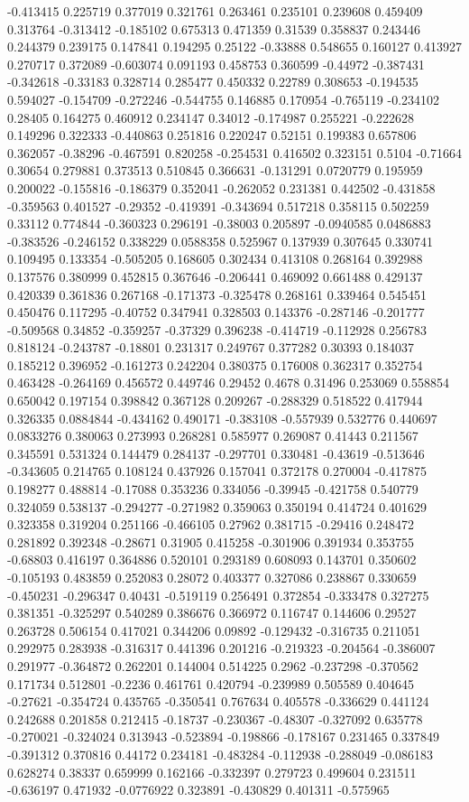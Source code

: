 -0.413415 0.225719 0.377019 0.321761 0.263461 0.235101 0.239608 0.459409 0.313764 -0.313412 -0.185102 0.675313 0.471359 0.31539 0.358837 0.243446 0.244379 0.239175 0.147841 0.194295 0.25122 -0.33888 0.548655 0.160127 0.413927 0.270717 0.372089 -0.603074 0.091193 0.458753 0.360599 -0.44972 -0.387431 -0.342618 -0.33183 0.328714 0.285477 0.450332 0.22789 0.308653 -0.194535 0.594027 -0.154709 -0.272246 -0.544755 0.146885 0.170954 -0.765119 -0.234102 0.28405 0.164275 0.460912 0.234147 0.34012 -0.174987 0.255221 -0.222628 0.149296 0.322333 -0.440863 0.251816 0.220247 0.52151 0.199383 0.657806 0.362057 -0.38296 -0.467591 0.820258 -0.254531 0.416502 0.323151 0.5104 -0.71664 0.30654 0.279881 0.373513 0.510845 0.366631 -0.131291 0.0720779 0.195959 0.200022 -0.155816 -0.186379 0.352041 -0.262052 0.231381 0.442502 -0.431858 -0.359563 0.401527 -0.29352 -0.419391 -0.343694 0.517218 0.358115 0.502259 0.33112 0.774844 -0.360323 0.296191 -0.38003 0.205897 -0.0940585 0.0486883 -0.383526 -0.246152 0.338229 0.0588358 0.525967 0.137939 0.307645 0.330741 0.109495 0.133354 -0.505205 0.168605 0.302434 0.413108 0.268164 0.392988 0.137576 0.380999 0.452815 0.367646 -0.206441 0.469092 0.661488 0.429137 0.420339 0.361836 0.267168 -0.171373 -0.325478 0.268161 0.339464 0.545451 0.450476 0.117295 -0.40752 0.347941 0.328503 0.143376 -0.287146 -0.201777 -0.509568 0.34852 -0.359257 -0.37329 0.396238 -0.414719 -0.112928 0.256783 0.818124 -0.243787 -0.18801 0.231317 0.249767 0.377282 0.30393 0.184037 0.185212 0.396952 -0.161273 0.242204 0.380375 0.176008 0.362317 0.352754 0.463428 -0.264169 0.456572 0.449746 0.29452 0.4678 0.31496 0.253069 0.558854 0.650042 0.197154 0.398842 0.367128 0.209267 -0.288329 0.518522 0.417944 0.326335 0.0884844 -0.434162 0.490171 -0.383108 -0.557939 0.532776 0.440697 0.0833276 0.380063 0.273993 0.268281 0.585977 0.269087 0.41443 0.211567 0.345591 0.531324 0.144479 0.284137 -0.297701 0.330481 -0.43619 -0.513646 -0.343605 0.214765 0.108124 0.437926 0.157041 0.372178 0.270004 -0.417875 0.198277 0.488814 -0.17088 0.353236 0.334056 -0.39945 -0.421758 0.540779 0.324059 0.538137 -0.294277 -0.271982 0.359063 0.350194 0.414724 0.401629 0.323358 0.319204 0.251166 -0.466105 0.27962 0.381715 -0.29416 0.248472 0.281892 0.392348 -0.28671 0.31905 0.415258 -0.301906 0.391934 0.353755 -0.68803 0.416197 0.364886 0.520101 0.293189 0.608093 0.143701 0.350602 -0.105193 0.483859 0.252083 0.28072 0.403377 0.327086 0.238867 0.330659 -0.450231 -0.296347 0.40431 -0.519119 0.256491 0.372854 -0.333478 0.327275 0.381351 -0.325297 0.540289 0.386676 0.366972 0.116747 0.144606 0.29527 0.263728 0.506154 0.417021 0.344206 0.09892 -0.129432 -0.316735 0.211051 0.292975 0.283938 -0.316317 0.441396 0.201216 -0.219323 -0.204564 -0.386007 0.291977 -0.364872 0.262201 0.144004 0.514225 0.2962 -0.237298 -0.370562 0.171734 0.512801 -0.2236 0.461761 0.420794 -0.239989 0.505589 0.404645 -0.27621 -0.354724 0.435765 -0.350541 0.767634 0.405578 -0.336629 0.441124 0.242688 0.201858 0.212415 -0.18737 -0.230367 -0.48307 -0.327092 0.635778 -0.270021 -0.324024 0.313943 -0.523894 -0.198866 -0.178167 0.231465 0.337849 -0.391312 0.370816 0.44172 0.234181 -0.483284 -0.112938 -0.288049 -0.086183 0.628274 0.38337 0.659999 0.162166 -0.332397 0.279723 0.499604 0.231511 -0.636197 0.471932 -0.0776922 0.323891 -0.430829 0.401311 -0.575965 